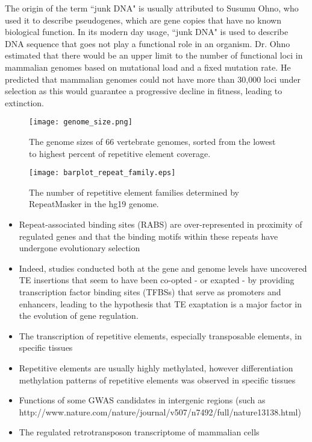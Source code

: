 The origin of the term ``junk DNA" is usually attributed to Susumu Ohno, who used it to describe pseudogenes, which are gene copies that have no known biological function. In its modern day usage, ``junk DNA" is used to describe DNA sequence that goes not play a functional role in an organism. Dr. Ohno estimated that there would be an upper limit to the number of functional loci in mammalian genomes based on mutational load and a fixed mutation rate. He predicted that mammalian genomes could not have more than 30,000 loci under selection as this would guarantee a progressive decline in fitness, leading to extinction.

\begin{figure}[h]
   \centering
   \texttt{[image: genome\_size.png]}
   \caption[Vertebrate genomes sizes]{The genome sizes of 66 vertebrate genomes, sorted from the lowest to highest percent of repetitive element coverage\cite{tang2014gensize}.}
   \label{fig:genome_size}
\end{figure}

\begin{figure}[h]
   \centering
   \texttt{[image: barplot\_repeat\_family.eps]}
   \caption[Tally of repetitive element families in the hg19 genome]{The number of repetitive element families determined by RepeatMasker in the hg19 genome.}
   \label{fig:repeat_family}
\end{figure}

\begin{itemize}
   \item Repeat-associated binding sites (RABS) are over-represented in proximity of regulated genes and that the binding motifs within these repeats have undergone evolutionary selection
   \item Indeed, studies conducted both at the gene and genome levels have uncovered TE insertions that seem to have been co-opted - or exapted - by providing transcription factor binding sites (TFBSs) that serve as promoters and enhancers, leading to the hypothesis that TE exaptation is a major factor in the evolution of gene regulation.
   \item The transcription of repetitive elements, especially transposable elements, in specific tissues
   \item Repetitive elements are usually highly methylated, however differentiation methylation patterns of repetitive elements was observed in specific tissues
   \item Functions of some GWAS candidates in intergenic regions (such as http://www.nature.com/nature/journal/v507/n7492/full/nature13138.html)
   \item The regulated retrotransposon transcriptome of mammalian cells\cite{pmid19377475}
\end{itemize}


